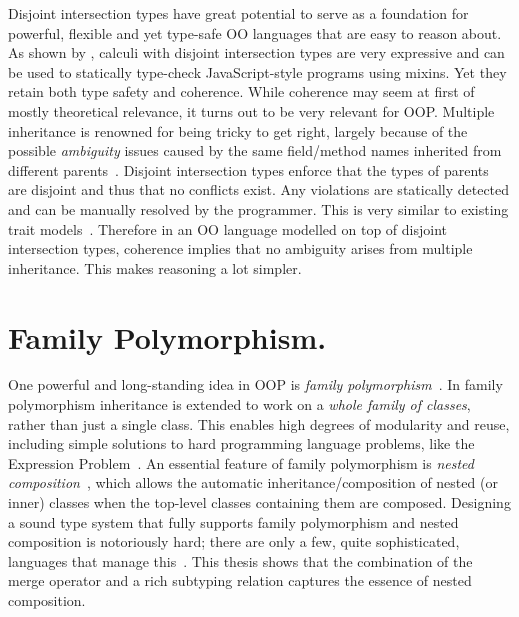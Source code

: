 Disjoint intersection types have great potential to serve as a foundation for
powerful, flexible and yet type-safe OO languages that are easy to reason
about. As shown by \citet{alpuimdisjoint}, calculi with disjoint intersection
types are very
expressive and can be used to statically type-check JavaScript-style programs
using mixins. Yet they retain both type safety and coherence. While
coherence may seem at first of mostly theoretical relevance, it
turns out to be very relevant for OOP. Multiple
inheritance is renowned for being tricky to get right, largely because of the
possible \emph{ambiguity} issues caused by the same field/method names
inherited from different parents~\citep{bracha1990mixin, scharli2003traits}. Disjoint intersection types
enforce that the types of parents are disjoint and thus that no conflicts exist.
Any violations are statically detected and can be manually resolved by the
programmer.
This is very similar to existing trait models~\citep{scharli2003traits, Ducasse_2006}. Therefore in an OO language
modelled on top of disjoint intersection types, coherence implies
that no ambiguity arises from multiple inheritance. This makes
reasoning a lot simpler.

\section{Family Polymorphism.}
One powerful and long-standing idea in OOP is \emph{family
  polymorphism}~\citep{Ernst_2001}. In family polymorphism inheritance is
extended to work on a \emph{whole family of classes}, rather than just a single
class. This enables high degrees of modularity and reuse, including simple
solutions to hard programming language problems, like the Expression
Problem~\citep{wadler1998expression}. An essential feature of family
polymorphism is \emph{nested composition}~\citep{Corradi_2012, ErnstVirtual,
  Nystrom_2004}, which allows the automatic inheritance/composition of nested
(or inner) classes when the top-level classes containing them are composed.
Designing a sound type system that fully supports family polymorphism and nested
composition is notoriously hard; there are only a few, quite sophisticated,
languages that manage this~\citep{ErnstVirtual, Nystrom_2004,
  pubsdoc:tribe-virtual-calculus, SAITO_2007}. This thesis shows that the
combination of the merge operator and a rich subtyping relation captures the
essence of nested composition.

